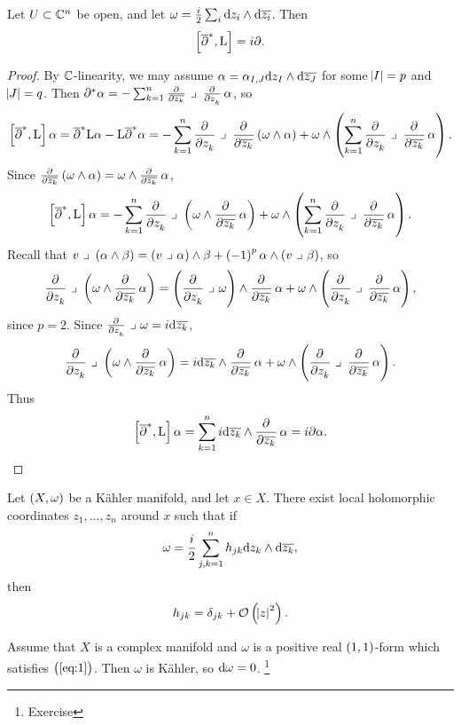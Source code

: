 \pagebreak

\begin{lemma}
Let $ U \subset \mathbb{C}^n $ be open, and let $ \omega = \tfrac{i}{2}\sum_i \mathrm{d} z_i \wedge \mathrm{d}\overline{z_i} $. Then
$$ \sbr{\dab^*, \L} = i\da. $$
\end{lemma}

\begin{proof}
By $ \mathbb{C} $-linearity, we may assume $ \alpha = \alpha_{I, J}\mathrm{d} z_I \wedge \mathrm{d}\overline{z_J} $ for some $ \abs{I} = p $ and $ \abs{J} = q $. Then $ \da^*\alpha = -\sum_{k = 1}^n \tpd{}{\overline{z_k}} \ \lrcorner \ \tpd{}{z_k}\alpha $, so
$$ \sbr{\dab^*, \L}\alpha = \dab^*\L\alpha - \L\dab^*\alpha = -\sum_{k = 1}^n \dpd{}{z_k} \ \lrcorner \ \dpd{}{\overline{z_k}}\br{\omega \wedge \alpha} + \omega \wedge \br{\sum_{k = 1}^n \dpd{}{z_k} \ \lrcorner \ \dpd{}{\overline{z_k}}\alpha}. $$
Since $ \tpd{}{\overline{z_k}}\br{\omega \wedge \alpha} = \omega \wedge \tpd{}{\overline{z_k}}\alpha $,
$$ \sbr{\dab^*, \L}\alpha = -\sum_{k = 1}^n \dpd{}{z_k} \ \lrcorner \ \br{\omega \wedge \dpd{}{\overline{z_k}}\alpha} + \omega \wedge \br{\sum_{k = 1}^n \dpd{}{z_k} \ \lrcorner \ \dpd{}{\overline{z_k}}\alpha}. $$
Recall that $ v \ \lrcorner \ \br{\alpha \wedge \beta} = \br{v \ \lrcorner \ \alpha} \wedge \beta + \br{-1}^p\alpha \wedge \br{v \ \lrcorner \ \beta} $, so
$$ \dpd{}{z_k} \ \lrcorner \ \br{\omega \wedge \dpd{}{\overline{z_k}}\alpha} = \br{\dpd{}{z_k} \ \lrcorner \ \omega} \wedge \dpd{}{\overline{z_k}}\alpha + \omega \wedge \br{\dpd{}{z_k} \ \lrcorner \ \dpd{}{\overline{z_k}}\alpha}, $$
since $ p = 2 $. Since $ \tpd{}{z_k} \ \lrcorner \ \omega = i\d\overline{z_k} $,
$$ \dpd{}{z_k} \ \lrcorner \ \br{\omega \wedge \dpd{}{\overline{z_k}}\alpha} = i\d\overline{z_k} \wedge \dpd{}{\overline{z_k}}\alpha + \omega \wedge \br{\dpd{}{z_k} \ \lrcorner \ \dpd{}{\overline{z_k}}\alpha}. $$
Thus
$$ \sbr{\dab^*, \L}\alpha = \sum_{k = 1}^n i\d\overline{z_k} \wedge \dpd{}{\overline{z_k}}\alpha = i\da\alpha. $$
\end{proof}

\begin{theorem}
Let $ \br{X, \omega} $ be a K\"ahler manifold, and let $ x \in X $. There exist local holomorphic coordinates $ z_1, \dots, z_n $ around $ x $ such that if
$$ \omega = \dfrac{i}{2}\sum_{j, k = 1}^n h_{jk}\mathrm{d} z_k \wedge \mathrm{d}\overline{z_k}, $$
then
$$ h_{jk} = \delta_{jk} + \OOO\br{\abs{z}^2}. $$
\end{theorem}

\begin{remark*}
Assume that $ X $ is a complex manifold and $ \omega $ is a positive real $ \br{1, 1} $-form which satisfies $ \br{\ref{eq:1}} $. Then $ \omega $ is K\"ahler, so $ \mathrm{d}\omega = 0 $. \footnote{Exercise}
\end{remark*}

